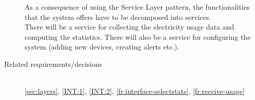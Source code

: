 \begin{description}
As a consequence of using the Service Layer pattern, the functionalities that the system offers have to be decomposed into services. \\
There will be a service for collecting the electricity usage data and computing the statistics. There will also be a service for configuring the system (adding new devices, creating alerts etc.).

\item [Related requirements/decisions]~\\
\ref{sec:layers}, \ref{INT:1}, \ref{INT:2}, \ref{fr:interface-selectstats}, \ref{fr:receive-usage}

\end{description}


%
%
%
%
%



